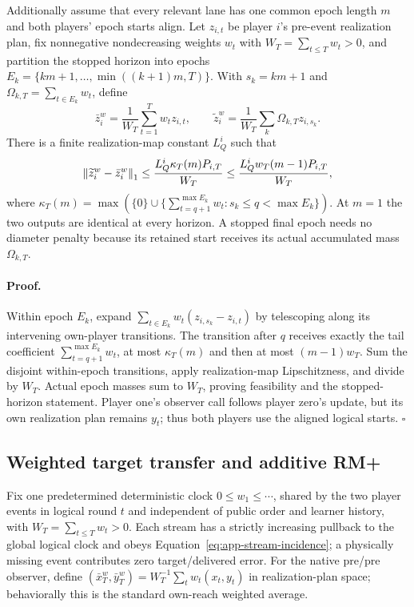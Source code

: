 \begin{lemma}
\label{lem:app-coverage-coreset}
Additionally assume that every relevant lane has one common epoch length $m$
and both players' epoch starts align.  Let $z_{i,t}$ be player $i$'s pre-event
realization plan, fix nonnegative nondecreasing weights $w_t$ with
$W_T=\sum_{t\le T}w_t>0$, and partition the stopped horizon into epochs
$E_k=\{km+1,\ldots,\min((k+1)m,T)\}$.  With $s_k=km+1$ and
$\Omega_{k,T}=\sum_{t\in E_k}w_t$, define
\begin{equation}
\bar z_i^w=\frac1{W_T}\sum_{t=1}^Tw_tz_{i,t},\qquad
\widetilde z_i^w=\frac1{W_T}\sum_k\Omega_{k,T}z_{i,s_k}.
\end{equation}
There is a finite realization-map constant $L_Q^i$ such that
\begin{equation}
\left\lVert \widetilde z_i^w-\bar z_i^w \right\rVert_1
\le\frac{L_Q^i\kappa_T(m)P_{i,T}}{W_T}
\le\frac{L_Q^iw_T(m-1)P_{i,T}}{W_T},
\label{eq:app-coverage-coreset}
\end{equation}
where
$\kappa_T(m)=\max(\{0\}\cup\{\sum_{t=q+1}^{\max E_k}w_t:
s_k\le q<\max E_k\})$.  At $m=1$ the two outputs are identical at every
horizon.  A stopped final epoch needs no diameter penalty because its retained
start receives its actual accumulated mass $\Omega_{k,T}$.
\end{lemma}

\paragraph{Proof.}
Within epoch $E_k$, expand
$\sum_{t\in E_k}w_t(z_{i,s_k}-z_{i,t})$ by telescoping along its intervening
own-player transitions.  The transition after $q$ receives exactly the tail
coefficient $\sum_{t=q+1}^{\max E_k}w_t$, at most $\kappa_T(m)$ and then at
most $(m-1)w_T$.  Sum the disjoint within-epoch transitions, apply
realization-map Lipschitzness, and divide by $W_T$.  Actual epoch masses sum
to $W_T$, proving feasibility and the stopped-horizon statement.  Player
one's observer call follows player zero's update, but its own realization plan
remains $y_t$; thus both players use the aligned logical starts. \hfill$\square$


\subsection{Weighted target transfer and additive RM+}
\label{app:weighted-rmplus}

Fix one predetermined deterministic clock
$0\le w_1\le\cdots$, shared by the two player events in logical round $t$ and
independent of public order and learner history, with
$W_T=\sum_{t\le T}w_t>0$.  Each stream has a strictly increasing pullback to
the global logical clock and obeys Equation~\ref{eq:app-stream-incidence}; a
physically missing event contributes zero target/delivered error.  For the native pre/pre observer, define
$(\bar x_T^w,\bar y_T^w)=W_T^{-1}\sum_t w_t(x_t,y_t)$ in realization-plan
space; behaviorally this is the standard own-reach weighted average.

